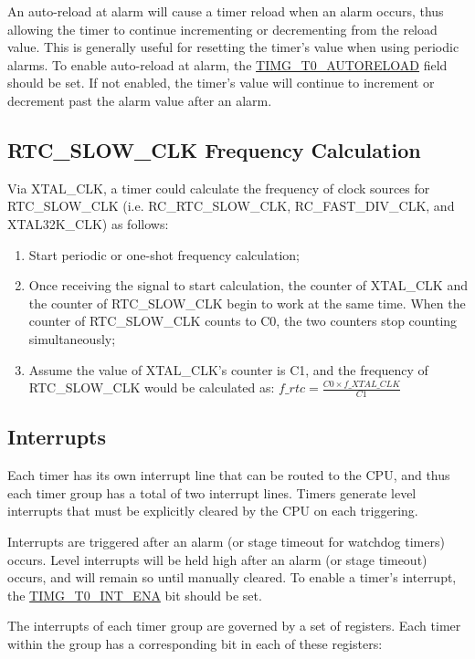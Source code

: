 \documentclass[main\_\_EN.tex]{subfiles}
\begin{document}
An auto-reload at alarm will cause a timer reload when an alarm occurs, thus allowing the timer to continue incrementing or decrementing from the reload value. This is generally useful for resetting the timer's value when using periodic alarms. To enable auto-reload at alarm, the \hyperref[fielddesc:TIMGTXAUTORELOAD]{TIMG\_T0\_AUTORELOAD} field should be set. If not enabled, the timer's value will continue to increment or decrement past the alarm value after an alarm.

\subsection{RTC\_SLOW\_CLK Frequency Calculation}

Via XTAL\_CLK, a timer could calculate the frequency of clock sources for RTC\_SLOW\_CLK (i.e. RC\_RTC\_SLOW\_CLK, RC\_FAST\_DIV\_CLK, and XTAL32K\_CLK) as follows:

\begin{enumerate}
    \item Start periodic or one-shot frequency calculation;
    \item Once receiving the signal to start calculation, the counter of XTAL\_CLK and the counter of RTC\_SLOW\_CLK begin to work at the same time. When the counter of RTC\_SLOW\_CLK counts to C0, the two counters stop counting simultaneously;
    \item Assume the value of XTAL\_CLK's counter is C1, and the frequency of RTC\_SLOW\_CLK would be calculated as:
    $f\_rtc = \frac{C0 \times f\_XTAL\_CLK}{C1}$
\end{enumerate}
   
\subsection{Interrupts}\label{sec:timg-interrupt}

Each timer has its own interrupt line that can be routed to the CPU, and thus each timer group has a total of two interrupt lines. Timers generate level interrupts that must be explicitly cleared by the CPU on each triggering.

Interrupts are triggered after an alarm (or stage timeout for watchdog timers) occurs. Level interrupts will be held high after an alarm (or stage timeout) occurs, and will remain so until manually cleared. To enable a timer's interrupt, the \hyperref[fielddesc:TIMGT0INTENA]{TIMG\_T0\_INT\_ENA} bit should be set.

The interrupts of each timer group are governed by a set of registers. Each timer within the group has a corresponding bit in each of these registers:
\end{document}
